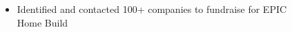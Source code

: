 \documentclass[11pt,A4,english]{article}
\begin{document}
\begin{paracol}{2}
\begin{rightcolumn}
\begin{addmargin}[0em]{0em}
\begin{addmargin}[-.5em]{0em}
\begin{itemize}
                    \vspace{-.1cm}
                    \item Identified and contacted 100+ companies to fundraise for EPIC \\
                    Home Build
                    \vspace{-.1cm}
                \end{itemize}
            \end{addmargin}
        \end{addmargin}

\end{rightcolumn}
\end{paracol}
\end{document}
